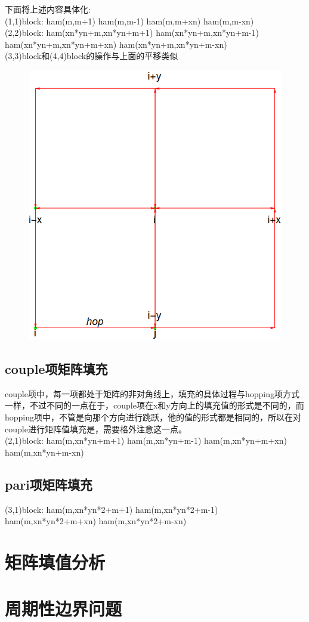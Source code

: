 \documentclass[a4paper,12pt]{ctexart}
\numberwithin{equation}{section}
\begin{document}
下面将上述内容具体化:\\
(1,1)block:  ham(m,m+1)   ham(m,m-1)   ham(m,m+xn)   ham(m,m-xn)\\
(2,2)block: ham(xn*yn+m,xn*yn+m+1)   ham(xn*yn+m,xn*yn+m-1)   ham(xn*yn+m,xn*yn+m+xn)   ham(xn*yn+m,xn*yn+m-xn)\\
(3,3)block和(4,4)block的操作与上面的平移类似
\begin{figure}[h]
	\centering
	\includegraphics[scale=0.6]{lattice.png}
\end{figure}
\subsection{couple项矩阵填充}
couple项中，每一项都处于矩阵的非对角线上，填充的具体过程与hopping项方式一样，不过不同的一点在于，couple项在x和y方向上的填充值的形式是不同的，而hopping项中，不管是向那个方向进行跳跃，他的值的形式都是相同的，所以在对couple进行矩阵值填充是，需要格外注意这一点。\\
(2,1)block:  ham(m,xn*yn+m+1)   ham(m,xn*yn+m-1)   ham(m,xn*yn+m+xn) ham(m,xn*yn+m-xn)
\subsection{pari项矩阵填充}
(3,1)block:  ham(m,xn*yn*2+m+1)   ham(m,xn*yn*2+m-1)   ham(m,xn*yn*2+m+xn) ham(m,xn*yn*2+m-xn)

\section{矩阵填值分析}

\section{周期性边界问题}












	
\end{document}
